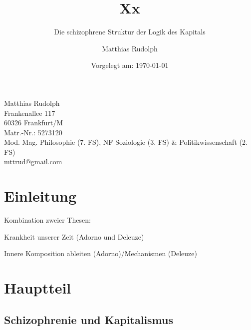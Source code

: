 \documentclass[12pt,
               DIV13,
               paper=a4,
               twoside=false,
               onehalfspacing,
               bibliography=totoc,
               toc=graduated,
               draft,
               ]{scrartcl}
\begin{document}
\setcounter{page}{0}

\titlehead{Goethe-Universität Frankfurt am Main\\
Fachbereich Philosophie und Geschichtswissenschaften\\
Institut für Philosophie\\
Prof. Dr. Christoph Menke\\
Seminar: Demokratie und Kapitalismus,
SoSe 2013\\
Modul: VM 3b}
\title{Xx}
\subtitle{Die schizophrene Struktur der Logik des Kapitals}
\author{Matthias Rudolph}
\date{Vorgelegt am: \today}

\maketitle
\vfill

\noindent Matthias Rudolph\\
Frankenallee 117\\
60326 Frankfurt/M\\
Matr.-Nr.: 5273120\\
Mod. Mag. Philosophie (7. FS), NF Soziologie (3. FS) \& Politikwissenschaft (2. FS)\\ %
mttrud@gmail.com
\newpage

\tableofcontents
\newpage


\section{Einleitung}

Kombination zweier Thesen:

Krankheit unserer Zeit (Adorno und Deleuze)

Innere Komposition ableiten (Adorno)/Mechanismen (Deleuze)


\section{Hauptteil}

\subsection{Schizophrenie und Kapitalismus}

\end{document}
